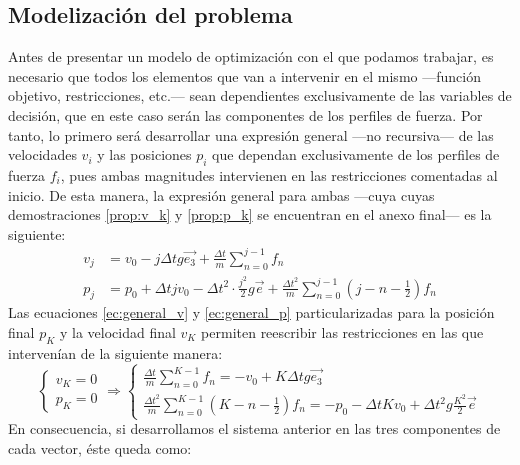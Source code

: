 \documentclass[10pt,a4paper]{article}
\begin{document}
\subsection{Modelización del problema}
Antes de presentar un modelo de optimización con el que podamos trabajar, es necesario que todos los elementos que van a intervenir en el mismo ---función objetivo, restricciones, etc.--- sean dependientes exclusivamente de las variables de decisión, que en este caso serán las componentes de los perfiles de fuerza. Por tanto, lo primero será desarrollar una expresión general ---no recursiva--- de las velocidades $v_i$ y las posiciones $p_i$ que dependan exclusivamente de los perfiles de fuerza $f_i$, pues ambas magnitudes intervienen en las restricciones comentadas al inicio. De esta manera, la expresión general para ambas ---cuya cuyas demostraciones \ref{prop:v_k} y \ref{prop:p_k} se encuentran en el anexo final--- es la siguiente: 
\begin{align}
v_j &= v_0 - j\Delta t g \vec{e_3} + \frac{\Delta t}{m} \sum_{n=0}^{j-1} f_n \label{ec:general_v}\\
p_j &= p_0 + \Delta t j v_0 - \Delta t^2\cdot \frac{j^2}{2} g \vec{e} + \frac{\Delta t^2}{m} \sum_{n=0}^{j-1}\left(j - n - \frac{1}{2}\right) f_n \label{ec:general_p}
\end{align}
Las ecuaciones \ref{ec:general_v} y \ref{ec:general_p} particularizadas para la posición final $p_K$ y la velocidad final $v_K$ permiten reescribir las restricciones en las que intervenían de la siguiente manera:
\[
\begin{cases}
v_K = 0 \\
p_K = 0
\end{cases}
\Rightarrow
\begin{cases}
\frac{\Delta t}{m} \sum_{n=0}^{K-1} f_n = -v_0 + K\Delta t g \vec{e_3} \\
\frac{\Delta t^2}{m} \sum_{n=0}^{K-1}\left(K - n - \frac{1}{2}\right) f_n = -p_0 - \Delta t K v_0 + \Delta t^2g \frac{K^2}{2}\vec{e}
\end{cases}
\]
En consecuencia, si desarrollamos el sistema anterior en las tres componentes de cada vector, éste queda como:
\end{document}
